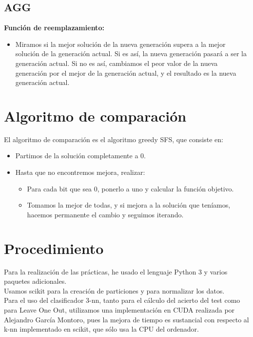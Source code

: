 \subsection{AGG}
\textbf{Función de reemplazamiento:}
\begin{itemize}
\item Miramos si la mejor solución de la nueva generación supera a la mejor solución de la generación actual. Si es así, la nueva generación pasará a ser la generación actual. Si no es así, cambiamos el peor valor de la nueva generación por el mejor de la generación actual, y el resultado es la nueva generación actual.
\end{itemize} 

\newpage
\section{Algoritmo de comparación}
El algoritmo de comparación es el algoritmo greedy SFS, que consiste en:
\begin{itemize}
\item Partimos de la solución completamente a 0.
\item Hasta que no encontremos mejora, realizar:
\begin{itemize}
\item Para cada bit que sea 0, ponerlo a uno y calcular la función objetivo.
\item Tomamos la mejor de todas, y si mejora a la solución que teníamos, hacemos permanente el cambio y seguimos iterando.
\end{itemize} 
\end{itemize} 
\newpage
\section{Procedimiento}
Para la realización de las prácticas, he usado el lenguaje Python 3 y varios paquetes adicionales.\\

Usamos scikit para la creación de particiones y para normalizar los datos.\\

Para el uso del clasificador 3-nn, tanto para el cálculo del acierto del test  como para Leave One Out, utilizamos una implementación en CUDA realizada por Alejandro García Montoro, pues la mejora de tiempo es sustancial con respecto al k-nn implementado en scikit, que sólo usa la CPU del ordenador.\\

